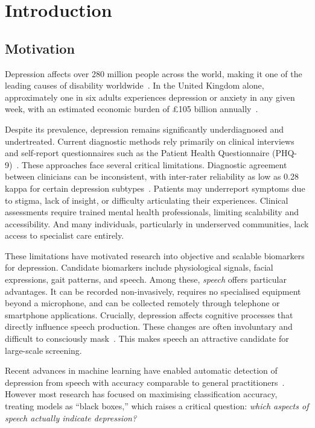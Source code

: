 \chapter{Introduction}

\section{Motivation}

Depression affects over 280 million people across the world, making it one of the leading causes of disability worldwide~\cite{WHO2024}. In the United Kingdom alone, approximately one in six adults experiences depression or anxiety in any given week, with an estimated economic burden of £105 billion annually~\cite{McManus2016, OECD2018}.

Despite its prevalence, depression remains significantly underdiagnosed and undertreated. Current diagnostic methods rely primarily on clinical interviews and self-report questionnaires such as the Patient Health Questionnaire (PHQ-9)~\cite{Kroenke2001}. These approaches face several critical limitations. Diagnostic agreement between clinicians can be inconsistent, with inter-rater reliability as low as 0.28 kappa for certain depression subtypes~\cite{Regier2013}. Patients may underreport symptoms due to stigma, lack of insight, or difficulty articulating their experiences. Clinical assessments require trained mental health professionals, limiting scalability and accessibility. And many individuals, particularly in underserved communities, lack access to specialist care entirely.

These limitations have motivated research into objective and scalable biomarkers for depression. Candidate biomarkers include physiological signals, facial expressions, gait patterns, and speech. Among these, \textit{speech} offers particular advantages. It can be recorded non-invasively, requires no specialised equipment beyond a microphone, and can be collected remotely through telephone or smartphone applications. Crucially, depression affects cognitive processes that directly influence speech production. These changes are often involuntary and difficult to consciously mask~\cite{Cummins2015}. This makes speech an attractive candidate for large-scale screening.

Recent advances in machine learning have enabled automatic detection of depression from speech with accuracy comparable to general practitioners~\cite{Tao2024}. However most research has focused on maximising classification accuracy, treating models as ``black boxes,'' which raises a critical question: \textit{which aspects of speech actually indicate depression?}

